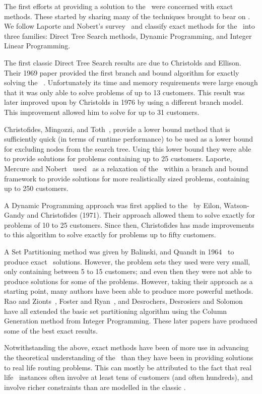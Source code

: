The first efforts at providing a solution to the \VRP\ were concerned with exact methods. These started by sharing many of the techniques brought to bear on \TSP. We follow Laporte and Nobert's survey~\cite{LANO:87} and classify exact methods for the \VRP\ into three families: Direct Tree Search methods, Dynamic Programming, and Integer Linear Programming.

The first classic Direct Tree Search results are due to Christolds and Ellison. Their 1969 paper provided the first branch and bound algorithm for exactly solving the \VRP~\cite{CE:1969}. Unfortunately its time and memory requirements were large enough that it was only able to solve problems of up to 13 customers. This result was later improved upon by Christolds in 1976 by using a different branch model. This improvement allowed him to solve for up to 31 customers. 

Christofides, Mingozzi, and Toth~\cite{CMT:1981}, provide a lower bound method that is sufficiently quick (in terms of runtime performance) to be used as a lower bound for excluding nodes from the search tree. Using this lower bound they were able to provide solutions for problems containing up to 25 customers. Laporte, Mercure and Nobert~\cite{LMN:1986} used \MTSP\ as a relaxation of the \VRP\ within a branch and bound framework to provide solutions for more realistically sized problems, containing up to 250 customers.  

A Dynamic Programming approach was first applied to the \VRP\ by Eilon, Watson-Gandy and Christofides (1971). Their approach allowed them to solve exactly for problems of 10 to 25 customers. Since then, Christofides has made improvements to this algorithm to solve exactly for problems up to fifty customers.

A Set Partitioning method was given by Balinski, and Quandt in 1964~\cite{balinski:64} to produce exact \VRP\ solutions. However, the problem sets they used were very small, only containing between 5 to 15 customers; and even then they were not able to produce solutions for some of the problems. However, taking their approach as a starting point, many authors have been able to produce more powerful methods. Rao and Zionts~\cite{RZ:1968}, Foster and Ryan~\cite{FR:1976}, and Desrochers, Desrosiers and Solomon~\cite{DMDJSM:1992} have all extended the basic set partitioning algorithm using the Column Generation method from Integer Programming. These later papers have produced some of the best exact results. 

Notwithstanding the above, exact methods have been of more use in advancing the theoretical understanding of the \VRP\ than they have been in providing solutions to real life routing problems. This can mostly be attributed to the fact that real life \VRP\ instances often involve at least tens of customers (and often hundreds), and involve richer constraints than are modelled in the classic \VRP.

